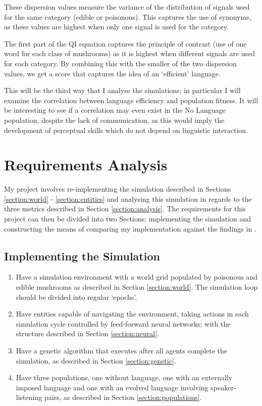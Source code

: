 \documentclass[12pt,a4paper,twoside,openright]{report}
\begin{document}
These dispersion values measure the variance of the distribution of signals used for the same category (edible or poisonous). This captures the use of synonyms, as these values are highest when only one signal is used for the category. 

The first part of the QI equation captures the principle of contrast (use of one word for each class of mushrooms) as it is highest when different signals are used for each category. By combining this with the smaller of the two dispersion values, we get a score that captures the idea of an `efficient' language.

This will be the third way that I analyse the simulations; in particular I will examine the correlation between language efficiency and population fitness. It will be interesting to see if a correlation may even exist in the No Language population, despite the lack of communication, as this would imply the development of perceptual skills which do not depend on linguistic interaction.

\section{Requirements Analysis}\label{section:requirements}

My project involves re-implementing the simulation described in Sections \ref{section:world} - \ref{section:entities} and analysing this simulation in regards to the three metrics described in Section \ref{section:analysis}. The requirements for this project can then be divided into two Sections; implementing the simulation and constructing the means of comparing my implementation against the findings in \citet{Cangelosi1998}.

\subsection*{Implementing the Simulation}

\begin{enumerate}

\item Have a simulation environment with a world grid populated by poisonous and edible mushrooms as described in Section \ref{section:world}. The simulation loop should be divided into regular `epochs'.

\item Have entities capable of navigating the environment, taking actions in each simulation cycle controlled by feed-forward neural networks; with the structure described in Section \ref{section:neural}.

\item Have a genetic algorithm that executes after all agents complete the simulation, as described in Section \ref{section:genetic}.

\item Have three populations, one without language, one with an externally imposed language and one with an evolved language involving speaker-listening pairs, as described in Section \ref{section:populations}.

\end{enumerate}
\end{document}
